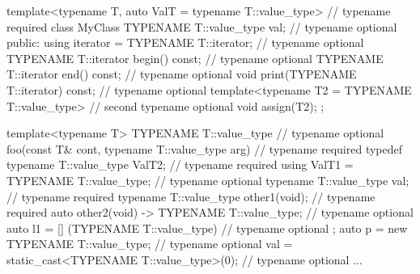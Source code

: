 \begin{cpp}
template<typename T,
auto ValT = typename T::value_type{}> // typename required
class MyClass {
	TYPENAME T::value_type val; // typename optional
	public:
	using iterator = TYPENAME T::iterator; // typename optional
	TYPENAME T::iterator begin() const; // typename optional
	TYPENAME T::iterator end() const; // typename optional
	void print(TYPENAME T::iterator) const; // typename optional
	template<typename T2 = TYPENAME T::value_type> // second typename optional
	void assign(T2);
};

template<typename T>
TYPENAME T::value_type // typename optional
foo(const T& cont, typename T::value_type arg) // typename required
{
	typedef typename T::value_type ValT2; // typename required
	using ValT1 = TYPENAME T::value_type; // typename optional
	typename T::value_type val; // typename required
	typename T::value_type other1(void); // typename required
	auto other2(void) -> TYPENAME T::value_type; // typename optional
	auto l1 = [] (TYPENAME T::value_type) { // typename optional
	};
	auto p = new TYPENAME T::value_type; // typename optional
	val = static_cast<TYPENAME T::value_type>(0); // typename optional
	...
}
\end{cpp}










